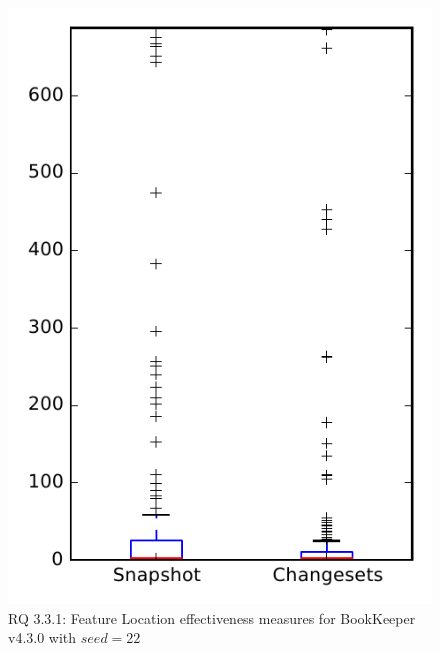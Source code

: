 
\begin{figure}
\centering
\includegraphics[height=0.4\textheight]{figures/flt_seed/rq1_bookkeeper_22}
\caption{RQ 3.3.1: Feature Location effectiveness measures for BookKeeper v4.3.0 with $seed=22$}
\label{fig:flt_seed:rq1:bookkeeper}
\end{figure}
